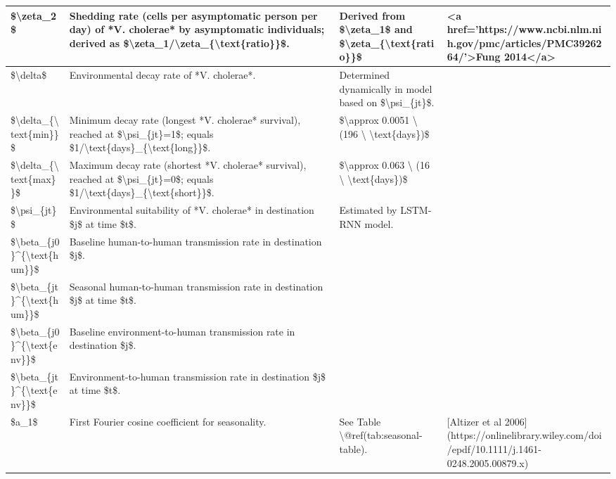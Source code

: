 \documentclass[
]{book}
\begin{document}
\begin{tabular}{l|l|l|l}
\hline
\$\textbackslash{}zeta\_2\$ & Shedding rate (cells per asymptomatic person per day) of *V. cholerae* by asymptomatic individuals; derived as \$\textbackslash{}zeta\_1/\textbackslash{}zeta\_\{\textbackslash{}text\{ratio\}\}\$. & Derived from \$\textbackslash{}zeta\_1\$ and \$\textbackslash{}zeta\_\{\textbackslash{}text\{ratio\}\}\$ & <a href='https://www.ncbi.nlm.nih.gov/pmc/articles/PMC3926264/'>Fung 2014</a>\\
\hline
\$\textbackslash{}delta\$ & Environmental decay rate of *V. cholerae*. & Determined dynamically in model based on \$\textbackslash{}psi\_\{jt\}\$. & \\
\hline
\$\textbackslash{}delta\_\{\textbackslash{}text\{min\}\}\$ & Minimum decay rate (longest *V. cholerae* survival), reached at \$\textbackslash{}psi\_\{jt\}=1\$; equals \$1/\textbackslash{}text\{days\}\_\{\textbackslash{}text\{long\}\}\$. & \$\textbackslash{}approx 0.0051 \textbackslash{} (196 \textbackslash{} \textbackslash{}text\{days\})\$ & \\
\hline
\$\textbackslash{}delta\_\{\textbackslash{}text\{max\}\}\$ & Maximum decay rate (shortest *V. cholerae* survival), reached at \$\textbackslash{}psi\_\{jt\}=0\$; equals \$1/\textbackslash{}text\{days\}\_\{\textbackslash{}text\{short\}\}\$. & \$\textbackslash{}approx 0.063 \textbackslash{} (16 \textbackslash{} \textbackslash{}text\{days\})\$ & \\
\hline
\$\textbackslash{}psi\_\{jt\}\$ & Environmental suitability of *V. cholerae* in destination \$j\$ at time \$t\$. & Estimated by LSTM-RNN model. & \\
\hline
\$\textbackslash{}beta\_\{j0\}\textasciicircum{}\{\textbackslash{}text\{hum\}\}\$ & Baseline human-to-human transmission rate in destination \$j\$. &  & \\
\hline
\$\textbackslash{}beta\_\{jt\}\textasciicircum{}\{\textbackslash{}text\{hum\}\}\$ & Seasonal human-to-human transmission rate in destination \$j\$ at time \$t\$. &  & \\
\hline
\$\textbackslash{}beta\_\{j0\}\textasciicircum{}\{\textbackslash{}text\{env\}\}\$ & Baseline environment-to-human transmission rate in destination \$j\$. &  & \\
\hline
\$\textbackslash{}beta\_\{jt\}\textasciicircum{}\{\textbackslash{}text\{env\}\}\$ & Environment-to-human transmission rate in destination \$j\$ at time \$t\$. &  & \\
\hline
\$a\_1\$ & First Fourier cosine coefficient for seasonality. & See Table \textbackslash{}@ref(tab:seasonal-table). & [Altizer et al 2006](https://onlinelibrary.wiley.com/doi/epdf/10.1111/j.1461-0248.2005.00879.x)\\

\end{tabular}
\end{document}
